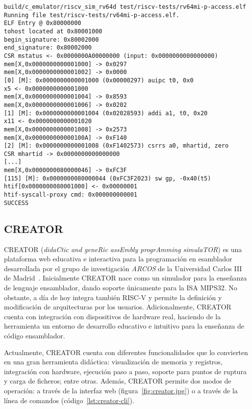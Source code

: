 \begin{lstlisting}[caption=Ejecución por línea de comandos de un programa en el simulador sail-riscv, label={lstl:sail}]
build/c_emulator/riscv_sim_rv64d test/riscv-tests/rv64mi-p-access.elf
Running file test/riscv-tests/rv64mi-p-access.elf.
ELF Entry @ 0x80000000
tohost located at 0x80001000
begin_signature: 0x80002000
end_signature: 0x80002000
CSR mstatus <- 0x0000000A00000000 (input: 0x0000000000000000)
mem[X,0x0000000000001000] -> 0x0297
mem[X,0x0000000000001002] -> 0x0000
[0] [M]: 0x0000000000001000 (0x00000297) auipc t0, 0x0
x5 <- 0x0000000000001000
mem[X,0x0000000000001004] -> 0x8593
mem[X,0x0000000000001006] -> 0x0202
[1] [M]: 0x0000000000001004 (0x02028593) addi a1, t0, 0x20
x11 <- 0x0000000000001020
mem[X,0x0000000000001008] -> 0x2573
mem[X,0x000000000000100A] -> 0xF140
[2] [M]: 0x0000000000001008 (0xF1402573) csrrs a0, mhartid, zero
CSR mhartid -> 0x0000000000000000
[...]
mem[X,0x0000000080000046] -> 0xFC3F
[115] [M]: 0x0000000080000044 (0xFC3F2023) sw gp, -0x40(t5)
htif[0x0000000080001000] <- 0x00000001
htif-syscall-proxy cmd: 0x000000000001
SUCCESS
\end{lstlisting}

\subsection{CREATOR}

CREATOR (\textit{didaCtic and geneRic assEmbly progrAmming simulaTOR}) es una
plataforma web educativa e interactiva para la programación en
esamblador desarrollada por el grupo de investigación \textit{ARCOS} de la
Universidad Carlos III de Madrid~\cite{camarmas2024creator}. Inicialmente
CREATOR nace como un
simulador para la enseñanza de lenguaje ensamblador, dando soporte únicamente
para la ISA MIPS32. No obstante, a día de hoy integra también RISC-V y permite
la definición y modificación de arquitecturas por los usuarios. Adicionalmente,
CREATOR cuenta con integración con dispositivos de hardware real, haciendo de
la herramienta un entorno de desarrollo educativo e intuitivo para la enseñanza
de código ensamblador.

Actualmente, CREATOR cuenta con diferentes funcionalidades que lo convierten en
una gran herramienta didáctica: visualización de memoria y registros,
integración con hardware, ejecución paso a paso, soporte para puntos de ruptura
y carga de ficheros; entre otras. Además, CREATOR permite dos modos de
operación: a través de la interfaz web (figura~\ref{fig:creator.jpg}) o a
través de la línea de comandos (código~\ref{lst:creator-cli}).


